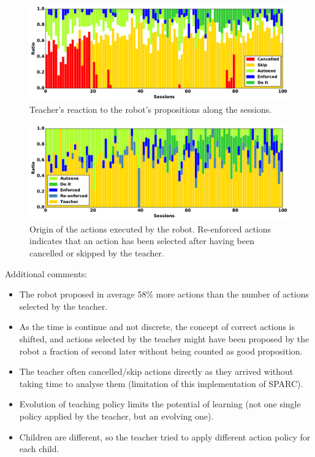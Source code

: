 \begin{figure}[ht]
	\includegraphics[width=1\linewidth]{propositions.pdf}
	\centering
	\caption{Teacher's reaction to the robot's propositions along the sessions.}
	\label{fig:tutoring_proposition}
\end{figure}


\begin{figure}[ht]
	\includegraphics[width=1\linewidth]{selections.pdf}
	\centering
	\caption{Origin of the actions executed by the robot. Re-enforced actions indicates that an action has been selected after having been cancelled or skipped by the teacher.}
	\label{fig:tutoring_selection}
\end{figure}

Additional comments:
\begin{itemize}
	\item The robot proposed in average 58\% more actions than the number of actions selected by the teacher.
	\item As the time is continue and not discrete, the concept of correct actions is shifted, and actions selected by the teacher might have been proposed by the robot a fraction of second later without being counted as good proposition.
	\item The teacher often cancelled/skip actions directly as they arrived without taking time to analyse them (limitation of this implementation of SPARC).
	\item Evolution of teaching policy limits the potential of learning (not one single policy applied by the teacher, but an evolving one).
	\item Children are different, so the teacher tried to apply different action policy for each child.
\end{itemize}



